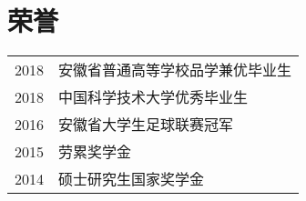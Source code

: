 \section*{荣誉}

\begin{tabular}{p{} p{}}
2018 & 安徽省普通高等学校品学兼优毕业生 \\
2018 & 中国科学技术大学优秀毕业生 \\
2016 & 安徽省大学生足球联赛冠军 \\
2015 & 劳累奖学金 \\
2014 & 硕士研究生国家奖学金 \\
\end{tabular}
